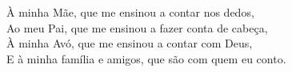 \begin{dedicatoria}
   \vspace*{\fill}
   \centering
   \noindent

   \vspace*{\fill}
   \vspace*{7cm} %
   \begin{flushright}
      \noindent
      À minha Mãe, que me ensinou a contar nos dedos, \\
      Ao meu Pai, que me ensinou a fazer conta de cabeça, \\
      À minha Avó, que me ensinou a contar com Deus, \\
      E à minha família e amigos, que são com quem eu conto.
   \end{flushright}
   \vspace*{\fill}
\end{dedicatoria}
